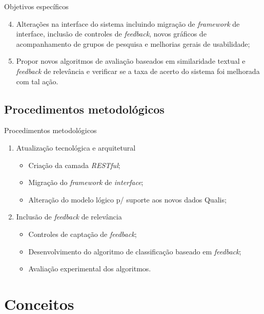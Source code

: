 \documentclass{beamer}
\begin{document}
\begin{frame}{Objetivos específicos}
  \begin{enumerate}[<+->]
    \setcounter{enumi}{3}

    \item Alterações na interface do sistema incluindo migração de \textit{framework} de interface, inclusão de controles de \textit{feedback}, novos gráficos de acompanhamento de grupos de pesquisa e melhorias gerais de usabilidade;

    \item Propor novos algoritmos de avaliação baseados em similaridade textual e \textit{feedback} de relevância e verificar se a taxa de acerto do sistema foi melhorada com tal ação.
  \end{enumerate}
\end{frame}

\subsection{Procedimentos metodológicos}

\begin{frame}{Procedimentos metodológicos}
  \begin{enumerate}
    \item Atualização tecnológica e arquitetural
      \begin{itemize}[<2->]
        \item Criação da camada \textit{RESTful};
        \item Migração do \textit{framework} de \textit{interface};
        \item Alteração do modelo lógico p/ suporte aos novos dados Qualis;
      \end{itemize}

    \item Inclusão de \textit{feedback} de relevância
      \begin{itemize}[<3->]
          \item Controles de captação de \textit{feedback};
          \item Desenvolvimento do algoritmo de classificação baseado em \textit{feedback};
          \item Avaliação experimental dos algoritmos.
      \end{itemize}
  \end{enumerate}
\end{frame}

\section{Conceitos}
\end{document}
